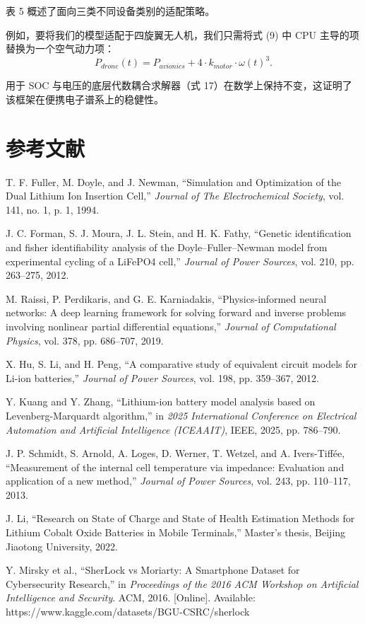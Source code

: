 \documentclass[11pt,a4paper]{ctexart}
\begin{document}
表 5 概述了面向三类不同设备类别的适配策略。

例如，要将我们的模型适配于四旋翼无人机，我们只需将式 (9) 中 CPU 主导的项替换为一个空气动力项：
\begin{equation}
P_{drone}(t)=P_{avionics}+4\cdot k_{motor}\cdot\omega(t)^3.
\end{equation}

用于 SOC 与电压的底层代数耦合求解器（式 17）在数学上保持不变，这证明了该框架在便携电子谱系上的稳健性。

\section*{参考文献}

\begin{enumerate}[label={[\arabic*]},leftmargin=2.6em,itemsep=0.3em]
\item T. F. Fuller, M. Doyle, and J. Newman, ``Simulation and Optimization of the Dual Lithium Ion Insertion Cell,'' \emph{Journal of The Electrochemical Society}, vol. 141, no. 1, p. 1, 1994.
\item J. C. Forman, S. J. Moura, J. L. Stein, and H. K. Fathy, ``Genetic identification and fisher identifiability analysis of the Doyle--Fuller--Newman model from experimental cycling of a LiFePO4 cell,'' \emph{Journal of Power Sources}, vol. 210, pp. 263--275, 2012.
\item M. Raissi, P. Perdikaris, and G. E. Karniadakis, ``Physics-informed neural networks: A deep learning framework for solving forward and inverse problems involving nonlinear partial differential equations,'' \emph{Journal of Computational Physics}, vol. 378, pp. 686--707, 2019.
\item X. Hu, S. Li, and H. Peng, ``A comparative study of equivalent circuit models for Li-ion batteries,'' \emph{Journal of Power Sources}, vol. 198, pp. 359--367, 2012.
\item Y. Kuang and Y. Zhang, ``Lithium-ion battery model analysis based on Levenberg-Marquardt algorithm,'' in \emph{2025 International Conference on Electrical Automation and Artificial Intelligence (ICEAAIT)}, IEEE, 2025, pp. 786--790.
\item J. P. Schmidt, S. Arnold, A. Loges, D. Werner, T. Wetzel, and A. Ivers-Tiff\'ee, ``Measurement of the internal cell temperature via impedance: Evaluation and application of a new method,'' \emph{Journal of Power Sources}, vol. 243, pp. 110--117, 2013.
\item J. Li, ``Research on State of Charge and State of Health Estimation Methods for Lithium Cobalt Oxide Batteries in Mobile Terminals,'' Master's thesis, Beijing Jiaotong University, 2022.
\item Y. Mirsky et al., ``SherLock vs Moriarty: A Smartphone Dataset for Cybersecurity Research,'' in \emph{Proceedings of the 2016 ACM Workshop on Artificial Intelligence and Security}. ACM, 2016. [Online]. Available: https://www.kaggle.com/datasets/BGU-CSRC/sherlock
\end{enumerate}
\end{document}

